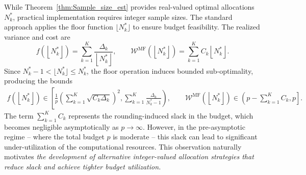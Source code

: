 While Theorem~\ref{thm:Sample_size_est} provides real-valued optimal allocations $N_k^*$, practical implementation requires integer sample sizes. The standard approach \cite{PeWiGu:2016} applies the floor function $\lfloor N_k^* \rfloor$ to ensure budget feasibility. The realized variance and cost are
%
\[
f\left(\left\lfloor N_k^* \right\rfloor\right) = \sum_{k=1}^K\frac{\Delta_{k}}{\left\lfloor N_k^* \right\rfloor}, \qquad \mathcal{W}^{\text{MF}}\left(\left\lfloor N_k^* \right\rfloor\right) = \sum_{k=1}^K C_k\left\lfloor N_k^* \right\rfloor.
\]
%
Since $N_k^*-1 < \lfloor N_k^*\rfloor \le N_k^*$, the floor operation induces bounded sub-optimality, producing the bounds
%
\begin{equation}\label{eq:bounds_for_floor}
\begin{aligned}
    f\left(\left\lfloor N_k^* \right\rfloor\right) \in \left[\frac{1}{p}\left(\sum_{k=1}^K \sqrt{C_k\Delta_k}\right)^2, \sum_{k=1}^K\frac{\Delta_{k}}{N_k^*-1}\right), \qquad
\mathcal{W}^{\text{MF}}\left(\left\lfloor N_k^* \right\rfloor\right)\in \left( p-\sum_{k=1}^K C_k, p\right].
\end{aligned}
\end{equation}
%
The term $\sum_{k=1}^K C_k$ represents the rounding-induced slack in the budget, which becomes negligible asymptotically as $p \to \infty$. However, in the pre-asymptotic regime -- where the total budget $p$ is moderate -- this  slack can lead to significant under-utilization of the computational resources. This observation naturally motivates \textit{the development of  alternative integer-valued allocation strategies that reduce slack and achieve tighter budget utilization.}





